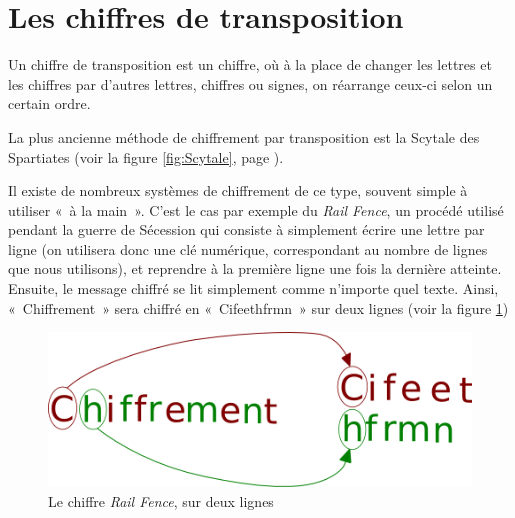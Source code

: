 \section{Les chiffres de transposition\label{sec:Transposition}}
Un chiffre de transposition est un chiffre, où à la place de changer
les lettres et les chiffres par d'autres lettres, chiffres ou signes,
on réarrange ceux-ci selon un certain ordre.

La plus ancienne méthode de chiffrement par transposition est la
Scytale des Spartiates (voir la figure \ref{fig:Scytale}, page
\pageref{fig:Scytale}).

Il existe de nombreux systèmes de chiffrement de ce type, souvent
simple à utiliser «~à la main~». C'est le cas par exemple du
\emph{Rail Fence}, un procédé utilisé pendant la guerre de Sécession
qui consiste à simplement écrire une lettre par ligne (on utilisera donc
une clé numérique, correspondant au nombre de lignes que nous utilisons), et
reprendre à la première ligne une fois la dernière atteinte. Ensuite,
le message chiffré se lit simplement comme n'importe quel texte.
Ainsi, «~Chiffrement~» sera chiffré en «~Cifeethfrmn~» sur deux
lignes (voir la figure \ref{fig:Transposition})
\begin{figure}[h]
  \begin{center}
    \includegraphics[scale=0.4]{images/Transposition.png}
  \end{center}
  \caption{Le chiffre \emph{Rail Fence}, sur deux lignes}
  \label{fig:Transposition}
\end{figure}

